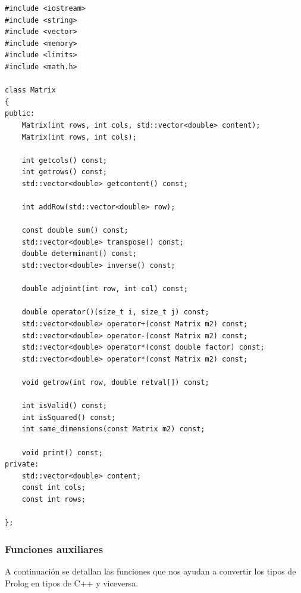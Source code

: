 \documentclass[a4paper]{article}
\begin{document}
\begin{lstlisting}[style=C++]
#include <iostream>
#include <string>
#include <vector>
#include <memory>
#include <limits>
#include <math.h>

class Matrix
{
public:
    Matrix(int rows, int cols, std::vector<double> content);
    Matrix(int rows, int cols);
    
    int getcols() const;
    int getrows() const;
    std::vector<double> getcontent() const;
    
    int addRow(std::vector<double> row);
	
	const double sum() const;
	std::vector<double> transpose() const;
	double determinant() const;
	std::vector<double> inverse() const;

	double adjoint(int row, int col) const;

    double operator()(size_t i, size_t j) const;
    std::vector<double> operator+(const Matrix m2) const;
    std::vector<double> operator-(const Matrix m2) const;
    std::vector<double> operator*(const double factor) const;
    std::vector<double> operator*(const Matrix m2) const;

    void getrow(int row, double retval[]) const;
    
    int isValid() const;
	int isSquared() const;
	int same_dimensions(const Matrix m2) const;

	void print() const;
private:
    std::vector<double> content;
    const int cols;
    const int rows;
    
};
\end{lstlisting}

\subsubsection{Funciones auxiliares}
A continuación se detallan las funciones que nos ayudan a convertir los tipos de Prolog en tipos de C++ y viceversa.
\end{document}

